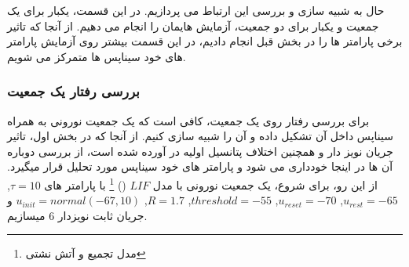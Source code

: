         حال به شبیه سازی و بررسی این ارتباط می پردازیم. در این قسمت، یکبار برای یک جمعیت و یکبار برای دو جمعیت، آزمایش هایمان را انجام می دهیم. از آنجا که تاثیر برخی پارامتر ها را در بخش قبل انجام دادیم، در این قسمت بیشتر روی آزمایش پارامتر های خود سیناپس ها متمرکز می شویم.
        \subsubsection{بررسی رفتار یک جمعیت}
            برای بررسی رفتار روی یک جمعیت، کافی است که یک جمعیت نورونی به همراه سیناپس داخل آن تشکیل داده و آن را شبیه سازی کنیم. از آنجا که در بخش اول، تاثیر جریان نویز دار و همچنین اختلاف پتانسیل اولیه در آورده شده است، از بررسی دوباره آن ها در اینجا خودداری می شود و پارامتر های خود سیناپس مورد تحلیل قرار میگیرد. از این رو، 
            برای شروع، یک جمعیت نورونی با مدل 
            $LIF$
            ()
            \footnote{مدل تجمیع و آتش نشتی}
            با پارامتر های 
            $\tau=10$,
            $u_{rest}=-65$,
            $u_{reset}=-70$,
            $threshold=-55$,
            $R=1.7$,
            $u_{init}=normal(-67,10)$
            و جریان ثابت نویزدار
            $6$ 
            میسازیم. 
